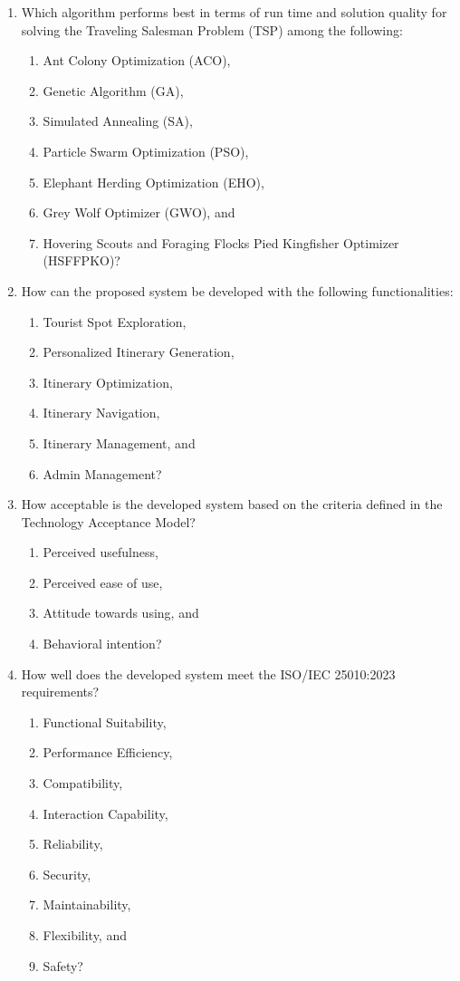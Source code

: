 \newpage
\begin{enumerate}
    \item Which algorithm performs best in terms of run time and solution quality for solving the Traveling Salesman Problem (TSP) among the following:
    \begin{enumerate} [label*=\arabic*.]
        \item Ant Colony Optimization (ACO),
        \item Genetic Algorithm (GA),
        \item Simulated Annealing (SA),
        \item Particle Swarm Optimization (PSO),
        \item Elephant Herding Optimization (EHO),
        \item Grey Wolf Optimizer (GWO), and
        \item Hovering Scouts and Foraging Flocks Pied Kingfisher Optimizer (HSFFPKO)?
    \end{enumerate}
    \item How can the proposed system be developed with the following functionalities:
    \begin{enumerate} [label*=\arabic*.]
        \item  Tourist Spot Exploration,
        \item  Personalized Itinerary Generation,
        \item  Itinerary Optimization,
        \item  Itinerary Navigation,
        \item  Itinerary Management, and
        \item  Admin Management?
    \end{enumerate}
    \item How acceptable is the developed system based on the criteria defined in the Technology Acceptance Model?
    \begin{enumerate} [label*=\arabic*.]
        \item Perceived usefulness,
        \item Perceived ease of use,
        \item Attitude towards using, and
        \item Behavioral intention?
    \end{enumerate}
    \item How well does the developed system meet the ISO/IEC 25010:2023 requirements?
    \begin{enumerate} [label*=\arabic*.]
        \item Functional Suitability,
        \item Performance Efficiency,
        \item Compatibility,
        \item Interaction Capability,
        \item Reliability,
        \item Security,
        \item Maintainability,
        \item Flexibility, and
        \item Safety?
    \end{enumerate}
\end{enumerate}

